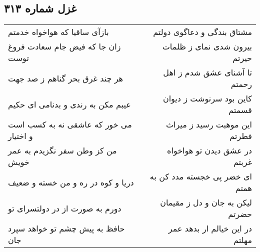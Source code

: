 \begin{center}
\section*{غزل شماره ۳۱۳}
\label{sec:sh313}
\begin{longtable}{l p{0.5cm} r}
بازآی ساقیا که هواخواه خدمتم
&&
مشتاق بندگی و دعاگوی دولتم
\\
زان جا که فیض جام سعادت فروغ توست
&&
بیرون شدی نمای ز ظلمات حیرتم
\\
هر چند غرق بحر گناهم ز صد جهت
&&
تا آشنای عشق شدم ز اهل رحمتم
\\
عیبم مکن به رندی و بدنامی ای حکیم
&&
کاین بود سرنوشت ز دیوان قسمتم
\\
می خور که عاشقی نه به کسب است و اختیار
&&
این موهبت رسید ز میراث فطرتم
\\
من کز وطن سفر نگزیدم به عمر خویش
&&
در عشق دیدن تو هواخواه غربتم
\\
دریا و کوه در ره و من خسته و ضعیف
&&
ای خضر پی خجسته مدد کن به همتم
\\
دورم به صورت از در دولتسرای تو
&&
لیکن به جان و دل ز مقیمان حضرتم
\\
حافظ به پیش چشم تو خواهد سپرد جان
&&
در این خیالم ار بدهد عمر مهلتم
\\
\end{longtable}
\end{center}
